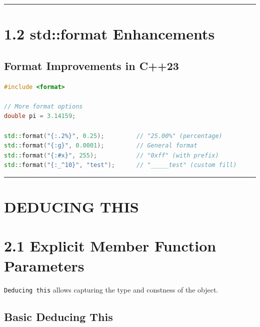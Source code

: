\begin{center}\rule{0.5\linewidth}{0.5pt}\end{center}

\hypertarget{stdformat-enhancements}{%
\section{1.2 std::format Enhancements}\label{stdformat-enhancements}}

\hypertarget{format-improvements-in-c23}{%
\subsection{Format Improvements in
C++23}\label{format-improvements-in-c23}}

\begin{lstlisting}[language={C++}]
#include <format>

// More format options
double pi = 3.14159;

std::format("{:.2%}", 0.25);         // "25.00%" (percentage)
std::format("{:g}", 0.0001);         // General format
std::format("{:#x}", 255);           // "0xff" (with prefix)
std::format("{:_^10}", "test");      // "_____test" (custom fill)
\end{lstlisting}

\begin{center}\rule{0.5\linewidth}{0.5pt}\end{center}

\hypertarget{deducing-this}{%
\section{DEDUCING THIS}\label{deducing-this}}

\hypertarget{explicit-member-function-parameters}{%
\section{2.1 Explicit Member Function
Parameters}\label{explicit-member-function-parameters}}

\passthrough{\lstinline!Deducing this!} allows capturing the type and
constness of the object.

\hypertarget{basic-deducing-this}{%
\subsection{Basic Deducing This}\label{basic-deducing-this}}

